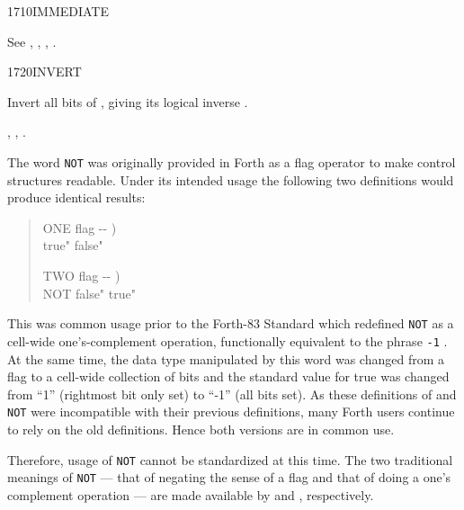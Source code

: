 \begin{worddef}{1710}{IMMEDIATE}
\begin{testing}
		See ,
			,
			,
			.
		\pagebreak
	\end{testing}
\end{worddef}

\vspace*{-2ex}
\begin{worddef}{1720}{INVERT}
\item {}

	Invert all bits of , giving its logical inverse
	.

\see {},
	,
	.

	\begin{rationale} %
		The word \texttt{NOT} was originally provided in Forth as a
		flag operator to make control structures readable. Under its
		intended usage the following two definitions would produce
		identical results:

		\begin{quote}\ttfamily
			\word{:} ONE  flag -{}- ) \\
			\tab {}
					 true"
					 false"
			\word{;}

			\word{:} TWO  flag -{}- ) \\
			\tab NOT 
					 false"
					 true"
			\word{;}
		\end{quote}

		This was common usage prior to the Forth-83 Standard which
		redefined \texttt{NOT} as a cell-wide one's-complement
		operation, functionally equivalent to the phrase \texttt{-1}
		. At the same time, the data type manipulated by
		this word was changed from a flag to a cell-wide collection of
		bits and the standard value for true was changed from ``1''
		(rightmost bit only set) to ``-1'' (all bits set). As these
		definitions of  and \texttt{NOT} were incompatible
		with their previous definitions, many Forth users continue to
		rely on the old definitions. Hence both versions are in common
		use.

		Therefore, usage of \texttt{NOT} cannot be standardized at
		this time. The two traditional meanings of \texttt{NOT} ---
		that of negating the sense of a flag and that of doing a one's
		complement operation --- are made available by  and
		, respectively.
	\end{rationale}

	\begin{testing} %
		 \\
		 \\
	\end{testing}
\end{worddef}

